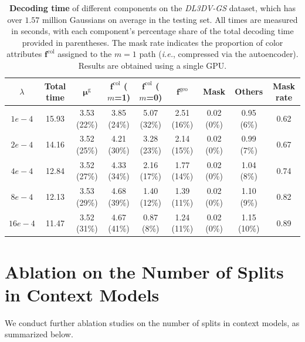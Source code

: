 \documentclass{article} %
\newcommand{\ie}{\textit{i.e.}}
\begin{document}
\begin{table}[H]
    \small
    \centering
    \caption{\textbf{Decoding time} of different components on the \textit{DL3DV-GS} dataset, which has over $1.57$ million Gaussians on average in the testing set. All times are measured in seconds, with each component’s percentage share of the total decoding time provided in parentheses. The mask rate indicates the proportion of color attributes $\bm{f}^{\text{col}}$ assigned to the $m=1$ path (\ie, compressed via the autoencoder). Results are obtained using a single GPU.}
    \vspace{5pt}
    \renewcommand{\arraystretch}{1.20}
    \begin{tabular}{c|c|cccccc|c}
        \toprule[2pt]
        $\lambda$   & Total time   & $\bm{\mu}^\text{g}$ & $\bm{f}^{\text{col}}$ ($m$=1) & $\bm{f}^{\text{col}}$ ($m$=0) & $\bm{f}^{\text{geo}}$ & Mask & Others & Mask rate  \\ \toprule
        $1e-4$ & 15.93 & 3.53 (22\%) & 3.85 (24\%) & 5.07 (32\%) & 2.51 (16\%) & 0.02 (0\%) & 0.95 (6\%) & 0.62     \\
        $2e-4$ & 14.16 & 3.52 (25\%) & 4.21 (30\%) & 3.28 (23\%) & 2.14 (15\%) & 0.02 (0\%) & 0.99 (7\%) & 0.67    \\
        $4e-4$ & 12.84 & 3.52 (27\%) & 4.33 (34\%) & 2.16 (17\%) & 1.77 (14\%) & 0.02 (0\%) & 1.04 (8\%) & 0.74    \\
        $8e-4$ & 12.13 & 3.53 (29\%) & 4.68 (39\%) & 1.40 (12\%) & 1.39 (11\%) & 0.02 (0\%) & 1.10 (9\%) & 0.82    \\
        $16e-4$ & 11.47 & 3.52 (31\%) & 4.67 (41\%) & 0.87 (8\%) & 1.24 (11\%) & 0.02 (0\%) & 1.15 (10\%) & 0.89    \\ \bottomrule[2pt]
    \end{tabular}
\end{table}
\clearpage

\section{Ablation on the Number of Splits in Context Models}
\label{sec:number_of_splits}
We conduct further ablation studies on the number of splits in context models, as summarized below.
\end{document}
